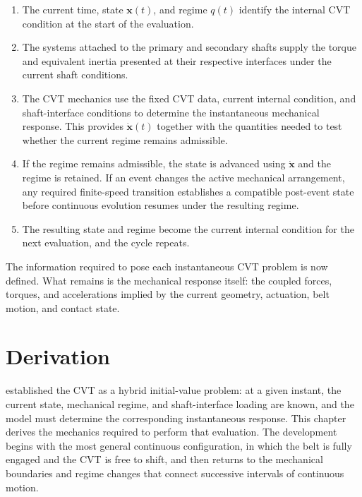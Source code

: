 \documentclass[11pt]{report}
\numberwithin{equation}{section}
\newcommand{\vect}[1]{\bm{#1}}
\begin{document}
\begin{enumerate}
    \item The current time, state \(\vect{x}(t)\), and regime \(q(t)\) identify
          the internal CVT condition at the start of the evaluation.
    \item The systems attached to the primary and secondary shafts supply the
          torque and equivalent inertia presented at their respective
          interfaces under the current shaft conditions.
    \item The CVT mechanics use the fixed CVT data, current internal condition,
          and shaft-interface conditions to determine the instantaneous
          mechanical response. This provides \(\dot{\vect{x}}(t)\) together
          with the quantities needed to test whether the current regime remains
          admissible.
    \item If the regime remains admissible, the state is advanced using
          \(\dot{\vect{x}}\) and the regime is retained. If an event changes
          the active mechanical arrangement, any required finite-speed
          transition establishes a compatible post-event state before
          continuous evolution resumes under the resulting regime.
    \item The resulting state and regime become the current internal condition
          for the next evaluation, and the cycle repeats.
\end{enumerate}

The information required to pose each instantaneous CVT problem is now
defined. What remains is the mechanical response itself: the coupled forces,
torques, and accelerations implied by the current geometry, actuation, belt
motion, and contact state.

\chapter{Derivation}
\label{chap:derivation}

 established the CVT as a hybrid initial-value problem: at a given
instant, the current state, mechanical regime, and shaft-interface loading are
known, and the model must determine the corresponding instantaneous response.
This chapter derives the mechanics required to perform that evaluation. The
development begins with the most general continuous configuration, in which the
belt is fully engaged and the CVT is free to shift, and then returns to the
mechanical boundaries and regime changes that connect successive intervals of
continuous motion.
\end{document}
